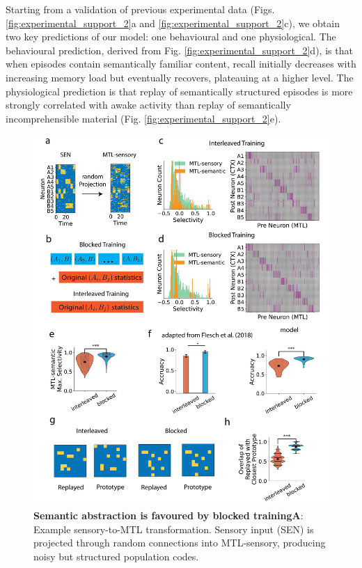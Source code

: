 \documentclass{article}
\begin{document}
\newline\newline
Starting from a validation of previous experimental data (Figs. \ref{fig:experimental_support_2}a and \ref{fig:experimental_support_2}c), we obtain two key predictions of our model: one behavioural and one physiological. The behavioural prediction, derived from Fig. \ref{fig:experimental_support_2}d), is that when episodes contain semantically familiar content, recall initially decreases with increasing memory load but eventually recovers, plateauing at a higher level. The physiological prediction is that replay of semantically structured episodes is more strongly correlated with awake activity than replay of semantically incomprehensible material (Fig. \ref{fig:experimental_support_2}e).
\begin{figure}
    \centering
    \includegraphics[width=0.95\linewidth]{Figures/Figure_5.png}
\caption{\textbf{Semantic abstraction is favoured by blocked training}\textbf{A}: Example sensory-to-MTL transformation. Sensory input (SEN) is projected through random connections into MTL-sensory, producing noisy but structured population codes.  
}
\end{figure}
\end{document}
